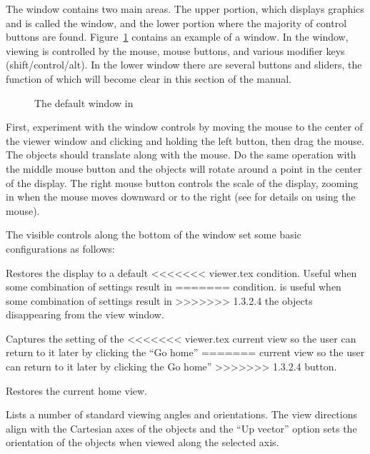 The \viewer{} window contains two main areas.  The upper portion,
which displays graphics and is called the \graphics{} window, and the
lower portion where the majority of control buttons are found.
Figure~\ref{fig:viewwindow} contains an example of a \viewer{} window.
In the \graphics{} window, viewing is controlled by the mouse, mouse
buttons, and various modifier keys (shift/control/alt).  In the lower
window there are several buttons and sliders, the function of which
will become clear in this section of the manual.

\begin{figure}[htb]
  \begin{makeimage}
  \end{makeimage}
  \viewerwindow
  \caption{\label{fig:viewwindow} The default \viewer{} window in \SR{}}
\end{figure}


First, experiment with the \graphics{} window controls by moving the mouse
to the center of the viewer window and clicking and holding the left button,
then drag the mouse.  The objects should translate along with the
mouse.  Do the same operation with the middle mouse button and the objects
will rotate around a point in the center of the display.  The right mouse
button controls the scale of the display, zooming in when the mouse moves
downward or to the right (see  for details on using the mouse).

The visible controls along the bottom of the \viewer{} window set some basic
configurations as follows:
%
\begin{description}
   Restores the display to a default
<<<<<<< viewer.tex
  condition.  Useful when some combination of settings result in
=======
  condition.  is useful when some combination of settings result in
>>>>>>> 1.3.2.4
  the objects disappearing from the view window.
  
   Captures the setting of the
<<<<<<< viewer.tex
  current view so the user can return to it later by clicking the ``Go home''
=======
  current view so the user can return to it later by clicking the Go home''
>>>>>>> 1.3.2.4
  button.

   Restores the current home view.
  
   Lists a number of standard viewing angles
  and orientations.  The view directions align with the Cartesian axes
  of the objects and the ``Up vector'' option sets the orientation of
  the objects when viewed along the selected axis.
\end{description}

